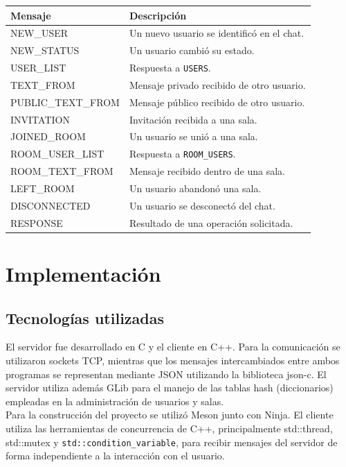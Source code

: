 \documentclass[12pt,a4paper]{article}
\begin{document}
\begin{table}[H]
    \centering
    \begin{tabular}{@{}ll@{}}
        \toprule
        \textbf{Mensaje} & \textbf{Descripción} \\
        \midrule
        NEW\_USER & Un nuevo usuario se identificó en el chat. \\
        NEW\_STATUS & Un usuario cambió su estado. \\
        USER\_LIST & Respuesta a \texttt{USERS}. \\
        TEXT\_FROM & Mensaje privado recibido de otro usuario. \\
        PUBLIC\_TEXT\_FROM & Mensaje público recibido de otro usuario. \\
        INVITATION & Invitación recibida a una sala. \\
        JOINED\_ROOM & Un usuario se unió a una sala. \\
        ROOM\_USER\_LIST & Respuesta a \texttt{ROOM\_USERS}. \\
        ROOM\_TEXT\_FROM & Mensaje recibido dentro de una sala. \\
        LEFT\_ROOM & Un usuario abandonó una sala. \\
        DISCONNECTED & Un usuario se desconectó del chat. \\
        RESPONSE & Resultado de una operación solicitada. \\
        \bottomrule
    \end{tabular}
    \label{tab:notificaciones}
\end{table}

\section{Implementación}

\subsection{Tecnologías utilizadas}

El servidor fue desarrollado en C y el cliente en C++. Para la comunicación
se utilizaron sockets TCP, mientras que los mensajes intercambiados entre
ambos programas se representan mediante JSON utilizando la biblioteca
json-c. El servidor utiliza además GLib para el manejo de las
tablas hash (diccionarios) empleadas en la administración de usuarios y salas.\\
Para la construcción del proyecto se utilizó Meson junto con Ninja. El
cliente utiliza las herramientas de concurrencia de C++, principalmente
std::thread, std::mutex y
\texttt{std::condition\_variable}, para recibir mensajes del servidor de
forma independiente a la interacción con el usuario.
\end{document}
